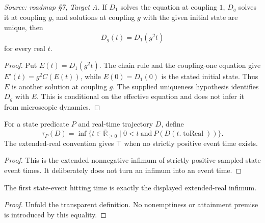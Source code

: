 \begin{theorem}
\label{thm:kinetic:solution-rescale}
%
%
\textit{Source: roadmap \S7, Target A.}
If $D_1$ solves the equation at coupling $1$, $D_g$ solves it at coupling $g$,
and solutions at coupling $g$ with the given initial state are unique, then
\[
  D_g(t)=D_1(g^2t)
\]
for every real $t$.
\end{theorem}
\begin{proof}


\leanok
Put $E(t)=D_1(g^2t)$.  The chain rule and the coupling-one equation give
$E'(t)=g^2C(E(t))$, while $E(0)=D_1(0)$ is the stated initial state.  Thus
$E$ is another solution at coupling $g$.  The supplied uniqueness hypothesis
identifies $D_g$ with $E$.  This is conditional on the effective equation and
does not infer it from microscopic dynamics.
\end{proof}

\begin{definition}
\label{def:kinetic:first-state-hit}
For a state predicate $P$ and real-time trajectory $D$, define
\[
 \tau_P(D)=\inf\{t\in\overline{\mathbb R}_{\geq0}
       \mid 0<t\ \text{and}\ P(D(t.\operatorname{toReal}))\}.
\]
The extended-real convention gives $\top$ when no strictly positive event time
exists.
\end{definition}
\begin{proof}


\leanok
This is the extended-nonnegative infimum of strictly positive sampled state
event times.  It deliberately does not turn an infimum into an event time.
\end{proof}

\begin{theorem}
\label{thm:kinetic:first-state-hit-sinf}
The first state-event hitting time is exactly the displayed extended-real
infimum.
\end{theorem}
\begin{proof}


\leanok
Unfold the transparent definition.  No nonemptiness or attainment premise is
introduced by this equality.
\end{proof}

